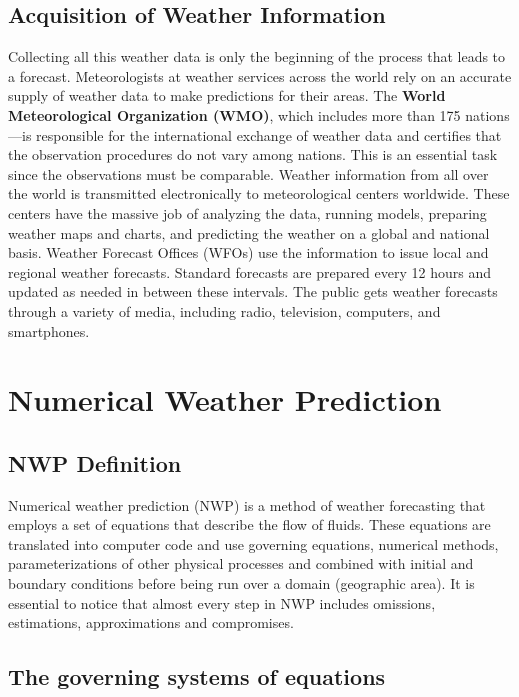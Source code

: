 \documentclass[12pt,oneside]{book}
\begin{document}
\subsection{Acquisition of Weather
Information}\label{acquisition-of-weather-information}

Collecting all this weather data is only the beginning of the process
that leads to a forecast. Meteorologists at weather services across the
world rely on an accurate supply of weather data to make predictions for
their areas. The \textbf{World Meteorological Organization (WMO)}, which
includes more than 175 nations---is responsible for the international
exchange of weather data and certifies that the observation procedures
do not vary among nations. This is an essential task since the
observations must be comparable. Weather information from all over the
world is transmitted electronically to meteorological centers worldwide.
These centers have the massive job of analyzing the data, running
models, preparing weather maps and charts, and predicting the weather on
a global and national basis. Weather Forecast Offices (WFOs) use the
information to issue local and regional weather forecasts. Standard
forecasts are prepared every 12 hours and updated as needed in between
these intervals. The public gets weather forecasts through a variety of
media, including radio, television, computers, and smartphones.

\section{Numerical Weather
Prediction}\label{numerical-weather-prediction}

\subsection{NWP Definition}\label{nwp-definition}

Numerical weather prediction (NWP) is a method of weather forecasting
that employs a set of equations that describe the flow of fluids. These
equations are translated into computer code and use governing equations,
numerical methods, parameterizations of other physical processes and
combined with initial and boundary conditions before being run over a
domain (geographic area). It is essential to notice that almost every
step in NWP includes omissions, estimations, approximations and
compromises.

\subsection{The governing systems of
equations}\label{the-governing-systems-of-equations}
\end{document}
